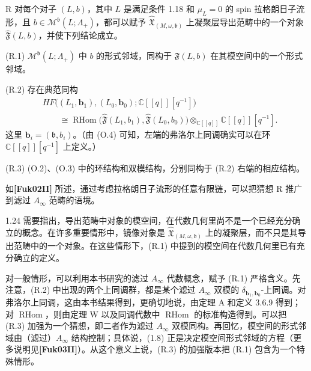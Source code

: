\begin{conjecture}{R}\label{conj:intro-R}
对每个对子 $(L,b)$，其中 $L$ 是满足条件 1.18 和 $\mu_L=0$ 的 spin 拉格朗日子流形，且
$b\in\mathcal M^{\mathfrak b}(L;\Lambda_+)$，都可以赋予
$\widehat{\mathfrak X}_{(M,\omega,\mathfrak b)}$ 上凝聚层导出范畴中的一个对象
$\hat{\mathfrak F}(L,b)$，并使下列结论成立。

\par\smallskip\noindent\textup{(R.1)}\quad
$\mathcal M^{\mathfrak b}(L;\Lambda_+)$ 中 $b$ 的形式邻域，同构于
$\hat{\mathfrak F}(L,b)$ 在其模空间中的一个形式邻域。

\par\smallskip\noindent\textup{(R.2)}\quad
存在典范同构
\[
\begin{split}
  &HF\bigl((L_1,\mathbf b_1),(L_0,\mathbf b_0);
    \mathbb C[[q]][q^{-1}]\bigr)\\
  &\qquad\cong
  \operatorname{RHom}\bigl(\hat{\mathfrak F}(L_1,b_1),
    \hat{\mathfrak F}(L_0,b_0)\bigr)
  \otimes_{\mathbb C[[q]]}\mathbb C[[q]][q^{-1}].
\end{split}
\]
这里 $\mathbf b_i=(\mathfrak b,b_i)$。（由 (O.4) 可知，左端的弗洛尔上同调确实可以在环 $\mathbb C[[q]][q^{-1}]$ 上定义。）

\par\smallskip\noindent\textup{(R.3)}\quad
(O.2)、(O.3) 中的环结构和双模结构，分别同构于 (R.2) 右端的相应结构。
\end{conjecture}

如\textbf{[Fuk02II]} 所述，通过考虑拉格朗日子流形的任意有限链，可以把猜想 R 推广到滤过 $A_\infty$ 范畴的语境。

\begin{remark}{1.24}\label{rem:1-24}
需要指出，导出范畴中对象的模空间，在代数几何里尚不是一个已经充分确立的概念。在许多重要情形中，镜像对象是
$\widehat{\mathfrak X}_{(M,\omega,\mathfrak b)}$ 上的凝聚层，而不只是其导出范畴中的一个对象。在这些情形下，(R.1) 中提到的模空间在代数几何里已有充分确立的定义。

对一般情形，可以利用本书研究的滤过 $A_\infty$ 代数概念，赋予 (R.1) 严格含义。先注意，(R.2) 中出现的两个上同调群，都是某个滤过 $A_\infty$ 双模的 $\delta_{\mathbf b_1,\mathbf b_0}$-上同调。对弗洛尔上同调，这由本书结果得到，更确切地说，由定理 A 和定义 3.6.9 得到；对 $\operatorname{RHom}$，则由定理 W 以及同调代数中 $\operatorname{RHom}$ 的标准构造得到。可以把 (R.3) 加强为一个猜想，即二者作为滤过 $A_\infty$ 双模同构。再回忆，模空间的形式邻域由（滤过）$A_\infty$ 结构控制；具体说，(1.8) 正是决定模空间形式邻域的方程（更多说明见\textbf{[Fuk03II]}）。从这个意义上说，(R.3) 的加强版本把 (R.1) 包含为一个特殊情形。
\end{remark}

